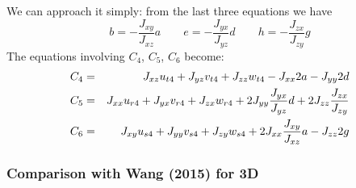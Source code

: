 We can approach it simply:
from the last three equations we have 
\[
b=-\frac{J_{xy}}{J_{xz}} a \quad\quad
e=-\frac{J_{yx}}{J_{yz}} d \quad\quad
h=-\frac{J_{zx}}{J_{zy}} g
\]
The equations involving $C_4$, $C_5$, $C_6$ become:
\begin{eqnarray}
C_4 &=& J_{xz} u_{t4} + J_{yz} v_{t4} + J_{zz} w_{t4} -J_{xx} 2a - J_{yy} 2d  \nn\\ %
C_5 &=& J_{xx} u_{r4} + J_{yx} v_{r4} + J_{zx} w_{r4} +2J_{yy} \frac{J_{yx}}{J_{yz}} d + 2J_{zz} \frac{J_{zx}}{J_{zy}}  \nn\\ %
C_6 &=& J_{xy} u_{s4} + J_{yy} v_{s4} + J_{zy} w_{s4} +2J_{xx} \frac{J_{xy}}{J_{xz}} a - J_{zz} 2g  \nn\\ %
\end{eqnarray}

\subsubsection{Comparison with Wang \etal (2015) for 3D}


